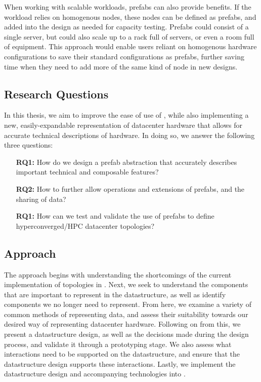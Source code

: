 \documentclass[11pt]{article}
\begin{document}
		When working with scalable workloads, prefabs can also provide benefits.
		If the workload relies on homogenous nodes, these nodes can be defined as prefabs, and added into the design as needed for capacity testing.
		Prefabs could consist of a single server, but could also scale up to a rack full of servers, or even a room full of equipment.
		This approach would enable users reliant on homogenous hardware configurations to save their standard configurations as prefabs, further saving time when they need to add more of the same kind of node in new designs.
	
	\subsection{Research Questions}
		In this thesis, we aim to improve the ease of use of \opendc{}, while also implementing a new, easily-expandable representation of datacenter hardware that allows for accurate technical descriptions of hardware. 
		In doing so, we answer the following three questions:
		\begin{itemize}
			\item [\textbf{RQ1:}] How do we design a prefab abstraction that accurately describes important technical and composable features?
			\item [\textbf{RQ2:}] How to further allow operations and extensions of prefabs, and the sharing of data?
			\item [\textbf{RQ1:}] How can we test and validate the use of prefabs to define hyperconverged/HPC datacenter topologies?
		\end{itemize}
	
	\subsection{Approach}
		The approach begins with understanding the shortcomings of the current implementation of topologies in \opendc{}.
		Next, we seek to understand the components that are important to represent in the datastructure, as well as identify components we no longer need to represent.
		From here, we examine a variety of common methods of representing data, and assess their suitability towards our desired way of representing datacenter hardware.
		Following on from this, we present a datastructure design, as well as the decisions made during the design process, and validate it through a prototyping stage.
		We also assess what interactions need to be supported on the datastructure, and ensure that the datastructure design supports these interactions.
		Lastly, we implement the datastructure design and accompanying technologies into \opendc{}.
	
\end{document}
